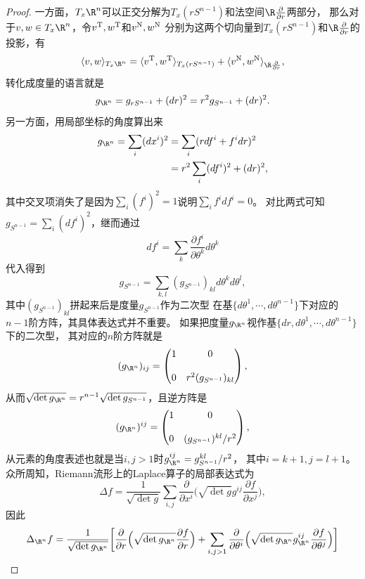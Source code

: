 \begin{itemize}
\begin{proof}
    一方面，$T_x\R^n$可以正交分解为$T_x(rS^{n-1})$和法空间$\R\frac{\partial}{\partial r}$两部分，
    那么对于$v,w \in T_x\R^n$，令$v^{\rm T},w^{\rm T}$和$v^{\rm N},w^{\rm N}$
    分别为这两个切向量到$T_x(rS^{n-1})$和$\R\frac{\partial}{\partial r}$的投影，有
    \[\langle v,w \rangle_{T_x\R^n}
    =\langle v^{\rm T},w^{\rm T} \rangle_{T_x(rS^{n-1})}
    +\langle v^{\rm N},w^{\rm N} \rangle_{\R\frac{\partial}{\partial r}},\]
    转化成度量的语言就是
    \[g_{\R^n}=g_{rS^{n-1}}+(dr)^2=r^2g_{S^{n-1}}+(dr)^2.\]
    另一方面，用局部坐标的角度算出来
    \begin{align*}
    g_{\R^n}=\sum_i(dx^i)^2&=\sum_i(rdf^i+f^idr)^2\\
    &=r^2\sum_i(df^i)^2+(dr)^2,
    \end{align*}
    其中交叉项消失了是因为$\sum_i(f^i)^2=1$说明$\sum_if^idf^i=0$。
    对比两式可知$g_{S^{n-1}}=\sum_i(df^i)^2$，继而通过
    \[df^i=\sum_k\frac{\partial f^i}{\partial\theta^k}d\theta^k\]
    代入得到
    \[g_{S^{n-1}}=\sum_{k,l}(g_{S^{n-1}})_{kl}d\theta^kd\theta^l,\]
    其中$(g_{S^{n-1}})_{kl}$拼起来后是度量$g_{S^{n-1}}$作为二次型
    在基$\{d\theta^1,\cdots,d\theta^{n-1}\}$下对应的$n-1$阶方阵，其具体表达式并不重要。
    如果把度量$g_{\R^n}$视作基$\{dr,d\theta^1,\cdots,d\theta^{n-1}\}$下的二次型，
    其对应的$n$阶方阵就是
    \[(g_{\R^n})_{ij}=\begin{pmatrix}
        1&0\\ & \\0&r^2(g_{S^{n-1}})_{kl}
    \end{pmatrix},\]
    从而$\sqrt{\det g_{\R^n}}=r^{n-1}\sqrt{\det g_{S^{n-1}}}$，且逆方阵是
    \[(g_{\R^n})^{ij}=\begin{pmatrix}
        1&0\\ & \\0&(g_{S^{n-1}})^{kl}/r^2
    \end{pmatrix},\]
    从元素的角度表述也就是当$i,j>1$时$g^{ij}_{\R^n}=g^{kl}_{S^{n-1}}/r^2$，
    其中$i=k+1,j=l+1$。众所周知，Riemann流形上的Laplace算子的局部表达式为
    \[\Delta f=\frac{1}{\sqrt{\det g}}\sum_{i,j}\frac{\partial}{\partial x^i}
    \Big(\sqrt{\det g}g^{ij}\frac{\partial f}{\partial x^j}\Big),\]
    因此
    \begin{align*}
    \Delta_{\R^n}f&=\frac{1}{\sqrt{\det g_{\R^n}}}\bigg[
    \frac{\partial}{\partial r}\Big(\sqrt{\det g_{\R^n}}\frac{\partial f}{\partial r}\Big)
    +\sum_{i,j>1}\frac{\partial}{\partial\theta^i}
    \Big(\sqrt{\det g_{\R^n}}g^{ij}_{\R^n}\frac{\partial f}{\partial\theta^j}\Big)\bigg]\\

\end{align*}
\end{proof}
\end{itemize}

